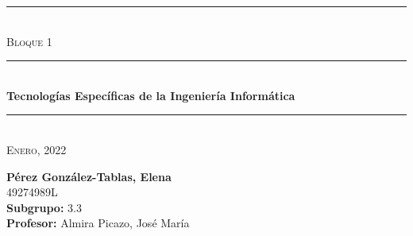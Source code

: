 \begin{titlepage}
	\begin{center}
		\rule{15cm}{0pt} \\
		[3cm]
		\textsc{\Large Bloque 1} \\
		\rule{15cm}{1pt} \\
		[0.25cm]
		\huge{\bfseries Tecnologías Específicas de la Ingeniería Informática} \\
		\rule{15cm}{1pt} \\
		[0.25cm]
		\textsc{\Large Enero, 2022}\\
		[9cm]
	\end{center}
	\begin{flushright}
		\textbf{Pérez González-Tablas, Elena} \\
		[0.25cm]
		49274989L \\
		[0.25cm]
		\textbf{Subgrupo:} 3.3 \\
		[0.25cm]
		\textbf{Profesor:} Almira Picazo, José María\\
	\end{flushright}
\end{titlepage}
\newpage